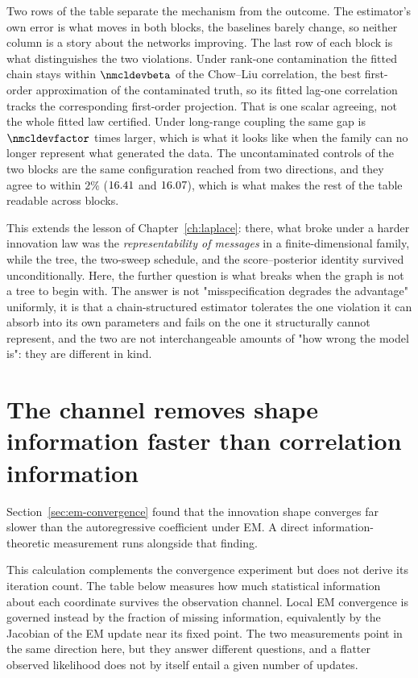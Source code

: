 Two rows of the table separate the mechanism from the outcome. The estimator's
own error is what moves in both blocks, the baselines barely change, so
neither column is a story about the networks improving. The last row of each block is what
distinguishes the two violations. Under rank-one contamination the fitted chain
stays within $\nmcldevbeta$ of the Chow--Liu correlation, the best first-order
approximation of the contaminated truth, so its fitted lag-one correlation
tracks the corresponding first-order projection. That is one scalar agreeing,
not the whole fitted law certified. Under long-range coupling the same gap is
$\nmcldevfactor$ times larger, which is what it looks like when the family can
no longer represent what generated the data. The uncontaminated controls of the two blocks are the
same configuration reached from two directions, and they agree to within $2\%$
($16.41$ and $16.07$), which is what makes the rest of the
table readable across blocks.

\begin{remark}
This extends the lesson of Chapter~\ref{ch:laplace}: there, what broke
under a harder innovation law was the \emph{representability of messages} in
a finite-dimensional family, while the tree, the two-sweep schedule, and the
score--posterior identity survived unconditionally. Here, the further
question is what breaks when the graph is not a tree to begin with. The
answer is not "misspecification degrades the advantage" uniformly, it is
that a chain-structured estimator tolerates the one violation it can
absorb into its own parameters and fails on the one it structurally cannot
represent, and the two are not interchangeable amounts of "how wrong the
model is": they are different in kind.
\end{remark}

\section{The channel removes shape information faster than correlation information}
\label{sec:em-information}

Section~\ref{sec:em-convergence} found that the innovation shape converges
far slower than the autoregressive coefficient under EM. A direct
information-theoretic measurement runs alongside that finding.

This calculation complements the convergence experiment but does not derive its
iteration count. The table below measures how much statistical information
about each coordinate survives the observation channel. Local EM convergence is
governed instead by the fraction of missing information, equivalently by the
Jacobian of the EM update near its fixed point. The two measurements point in
the same direction here, but they answer different questions, and a flatter
observed likelihood does not by itself entail a given number of updates.

